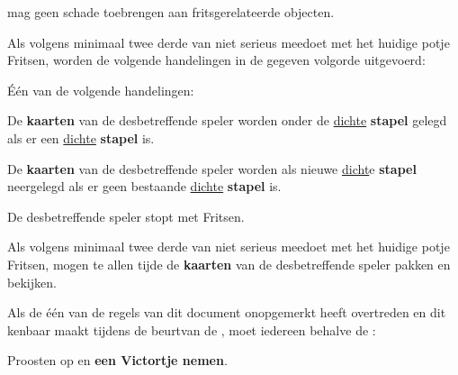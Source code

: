\vervolgLijst{}
\item \EenSpeler mag geen schade toebrengen aan fritsgerelateerde objecten.
\eindLijst{}



\vervolgLijst{}
\item Als \eenSpeler volgens minimaal twee derde van \alleSpelers niet serieus meedoet met het huidige potje Fritsen, worden de volgende handelingen in de gegeven volgorde uitgevoerd:
\numeriekeLijst{}
\item Één van de volgende handelingen:
\puntLijst{}
\item De \textbf{kaarten} van de desbetreffende speler worden onder de \ul{dichte} \textbf{stapel} gelegd als er een \ul{dichte} \textbf{stapel} is.
\item De \textbf{kaarten} van de desbetreffende speler worden als nieuwe \ul{dicht}e \textbf{stapel} neergelegd als er geen bestaande \ul{dichte} \textbf{stapel} is.
\eindPuntLijst{}
\item De desbetreffende speler stopt met Fritsen.
\eindNumeriekeLijst{}
\eindLijst{}

\vervolgLijst{}
\item Als \eenSpeler volgens minimaal twee derde van \alleSpelers niet serieus meedoet met het huidige potje Fritsen, mogen \alleSpelers te allen tijde de \textbf{kaarten} van de desbetreffende speler pakken en bekijken.
\eindLijst{}


\vervolgLijst{}
\item Als de \vorigeSpeler één van de regels van dit document onopgemerkt heeft overtreden en dit kenbaar maakt tijdens de beurt\footnotemark[1] van de \huidigeSpelerN, moet iedereen behalve de \vorigeSpelerN:
\puntLijst{}
\item Proosten op  en \textbf{een Victortje nemen}\footnotemark[2].
\eindPuntLijst{}
\eindLijst{}


\newpage
{}
\label{hoofdstuk:beginfase_start}

